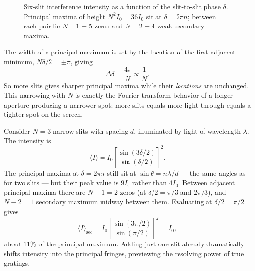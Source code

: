 \begin{figure}[ht]
    \centering
    \caption{Six-slit interference intensity as a function of the slit-to-slit phase $\delta$. Principal maxima of height $N^2 I_0 = 36 I_0$ sit at $\delta = 2\pi n$; between each pair lie $N-1 = 5$ zeros and $N-2 = 4$ weak secondary maxima.}
    \label{fig:nslit-intensity}
\end{figure}

The width of a principal maximum is set by the location of the first adjacent minimum, $N\delta/2 = \pm\pi$, giving
\begin{equation}
    \Delta\delta = \frac{4\pi}{N} \propto \frac{1}{N}.
\end{equation}
So more slits gives sharper principal maxima while their \emph{locations} are unchanged. This narrowing-with-$N$ is exactly the Fourier-transform behavior of a longer aperture producing a narrower spot: more slits equals more light through equals a tighter spot on the screen.

\begin{example}
Consider $N=3$ narrow slits with spacing $d$, illuminated by light of wavelength $\lambda$. The intensity is
\begin{equation}
    \langle I \rangle = I_0 \left[\frac{\sin(3\delta/2)}{\sin(\delta/2)}\right]^2.
\end{equation}
The principal maxima at $\delta = 2\pi n$ still sit at $\sin\theta = n\lambda/d$ --- the same angles as for two slits --- but their peak value is $9 I_0$ rather than $4 I_0$. Between adjacent principal maxima there are $N-1 = 2$ zeros (at $\delta/2 = \pi/3$ and $2\pi/3$), and $N-2 = 1$ secondary maximum midway between them. Evaluating at $\delta/2 = \pi/2$ gives
\begin{equation}
    \langle I\rangle_{\text{sec}} = I_0\left[\frac{\sin(3\pi/2)}{\sin(\pi/2)}\right]^2 = I_0,
\end{equation}
about $11\%$ of the principal maximum. Adding just one slit already dramatically shifts intensity into the principal fringes, previewing the resolving power of true gratings.
\end{example}

